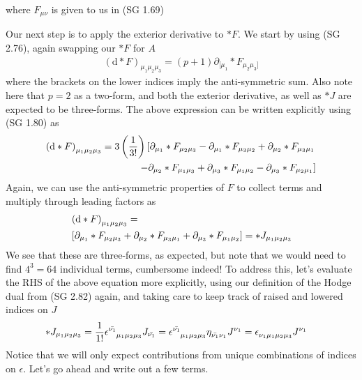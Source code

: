 %
where $F_{\mu\nu}$ is given to us in (SG 1.69)

Our next step is to apply the exterior derivative to $\ast F$. We start by using (SG 2.76), again swapping our $\ast F$ for $A$
%
\begin{align}
	\left(\textrm{d} \ast F\right)_{\mu_1\mu_2\mu_3} = (p+1) \partial_{[\mu_1} \ast F_{\mu_2\mu_3]}
\end{align}
%
where the brackets on the lower indices imply the anti-symmetric sum. Also note here that $p=2$ as a two-form, and both the exterior derivative, as well as $\ast J$ are expected to be three-forms. The above expression can be written explicitly using (SG 1.80) as 
%
\begin{align}
	\left(\textrm{d} \ast F\right)_{\mu_1\mu_2\mu_3} = 3 \left(\frac{1}{3!}\right) \left[ \partial_{\mu_1} \ast F_{\mu_2\mu_3} - \partial_{\mu_1} \ast F_{\mu_3\mu_2} + \partial_{\mu_2} \ast F_{\mu_3\mu_1}  \right. \notag \\ \left. - \partial_{\mu_2} \ast F_{\mu_1\mu_3} + \partial_{\mu_3} \ast F_{\mu_1\mu_2} - \partial_{\mu_3} \ast F_{\mu_2\mu_1} \right]
\end{align}
%
Again, we can use the anti-symmetric properties of $F$ to collect terms and multiply through leading factors as 
%
\begin{align}
	&\left(\textrm{d} \ast F\right)_{\mu_1\mu_2\mu_3} = \notag \\ &\left[ \partial_{\mu_1} \ast F_{\mu_2\mu_3} + \partial_{\mu_2} \ast F_{\mu_3\mu_1}  + \partial_{\mu_3} \ast F_{\mu_1\mu_2} \right] = \ast J_{\mu_1\mu_2\mu_3} 
\end{align}
%
We see that these are three-forms, as expected, but note that we would need to find $4^3 = 64$ individual terms, cumbersome indeed! To address this, let's evaluate the RHS of the above equation more explicitly, using our definition of the Hodge dual from (SG 2.82) again, and taking care to keep track of raised and lowered indices on $J$
%
\begin{align}
\ast J_{\mu_1\mu_2\mu_3} &= \frac{1}{1!} \epsilon\indices{^{{\bar{\nu_1}}}_{{\mu_1}{\mu_2}{\mu_3}}} J_{\bar{\nu_1}} 
= \epsilon\indices{^{{\bar{\nu_1}}}_{{\mu_1}{\mu_2}{\mu_3}}} \eta\indices{_{\bar{\nu_1}\nu_1}} J\indices{^{\nu_1}}
= \epsilon\indices{_{{\nu_1}{\mu_1}{\mu_2}{\mu_3}}} J\indices{^{\nu_1}}
\end{align} 
%
Notice that we will only expect contributions from unique combinations of indices on $\epsilon$. Let's go ahead and write out a few terms. 
%
